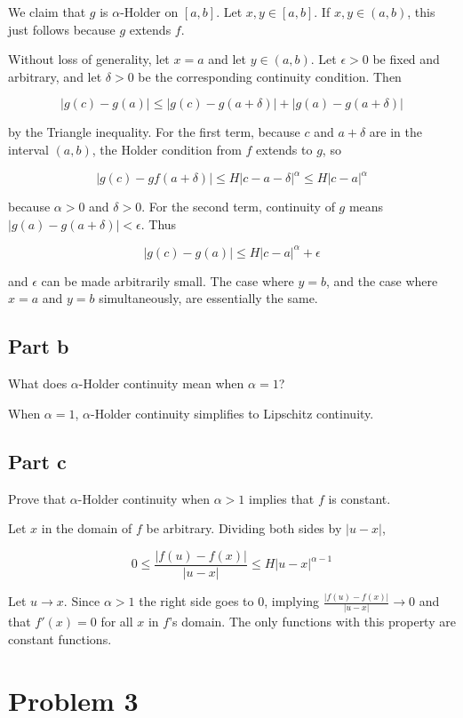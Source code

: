 \documentclass{article}
\begin{document}
We claim that $g$ is $\alpha$-Holder on $[a, b]$. Let $x, y \in [a, b]$. If $x, y \in (a, b)$, this just follows because $g$ extends $f$.

Without loss of generality, let $x = a$ and let $y \in (a, b)$. Let $\epsilon > 0$ be fixed and arbitrary, and let $\delta>0$ be the corresponding continuity condition. Then

\[
|g(c) - g(a)| \leq |g(c) - g(a+\delta)| + |g(a) - g(a+\delta)|
\]

by the Triangle inequality. For the first term, because $c$ and $a+\delta$ are in the interval $(a, b)$, the Holder condition from $f$ extends to $g$, so

\[
|g(c) - g{f}(a+\delta)| \leq H|c-a-\delta|^\alpha \leq H|c-a|^\alpha
\]

because $\alpha > 0$ and $\delta > 0$. For the second term, continuity of $g$ means $|g(a) - g(a+\delta)| < \epsilon$. Thus

\[
|g(c) - g(a)| \leq H|c-a|^\alpha + \epsilon
\]

and $\epsilon$ can be made arbitrarily small. The case where $y = b$, and the case where $x=a$ and $y=b$ simultaneously, are essentially the same.

\subsection*{Part b}

What does $\alpha$-Holder continuity mean when $\alpha = 1$?

When $\alpha=1$, $\alpha$-Holder continuity simplifies to Lipschitz continuity.

\subsection*{Part c}

Prove that $\alpha$-Holder continuity when $\alpha > 1$ implies that $f$ is constant.

Let $x$ in the domain of $f$ be arbitrary. Dividing both sides by $|u-x|$,

\[
0 \leq \frac{|f(u)-f(x)|}{|u-x|} \leq H|u-x|^{\alpha-1}
\]

Let $u \rightarrow x$. Since $\alpha > 1$ the right side goes to $0$, implying $\frac{|f(u)-f(x)|}{|u-x|} \rightarrow 0$ and that $f'(x) = 0$ for all $x$ in $f$'s domain. The only functions with this property are constant functions.

\section*{Problem 3}
\end{document}
